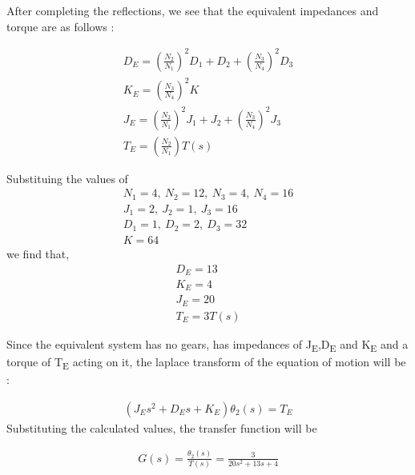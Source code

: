 \documentclass{beamer}
\theoremstyle{remark}
\numberwithin{equation}{section}
\begin{document}
\begin{frame}

After completing the reflections, we see that the equivalent impedances and torque are as follows :

\begin{align*}
    
    D_E = \left( \frac{N_2}{N_1} \right)^2 D_1 + D_2 + \left( \frac{N_3}{N_4} \right)^2 D_3\\
    
    K_E = \left( \frac{N_3}{N_4} \right)^2 K\\
    
    J_E = \left( \frac{N_2}{N_1} \right)^2 J_1 + J_2 + \left( \frac{N_3}{N_4} \right)^2 J_3\\
    
    T_E = \left( \frac{N_2}{N_1} \right)T(s)
    
\end{align*}
\end{frame}

\begin{frame}
    
    Substituing the values of
    \begin{align*}
        N_1 = 4, \ N_2 = 12, \ N_3 = 4, \ N_4 = 16\\
        J_1 = 2, \ J_2 = 1, \ J_3 = 16\\
        D_1 = 1, \ D_2 = 2, \ D_3 = 32\\
        K = 64
    \end{align*}
    we find that,
    \begin{align*}
        D_E = 13\\
        K_E = 4\\
        J_E = 20\\
        T_E = 3T(s)
    \end{align*}
    
\end{frame}

\begin{frame}
    
    Since the equivalent system has no gears, has impedances of J\textsubscript{E},D\textsubscript{E} and K\textsubscript{E} and a torque of T\textsubscript{E} acting on it, the laplace transform of the equation of motion will be :
    
    \begin{align*}
        (J_Es^2+D_Es+K_E)\theta_2(s) = T_E
    \end{align*}
    Substituting the calculated values, the transfer function will be
    
    \begin{align*}
        G(s) = \frac{\theta_2(s)}{T(s)} = \frac{3}{20s^2+13s+4}
    \end{align*}
    
\end{frame}
\end{document}
